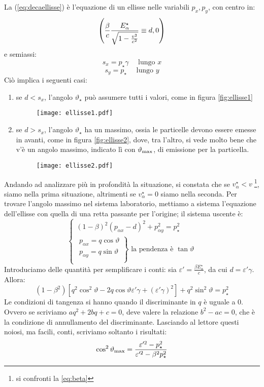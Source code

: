 La (\ref{eq:decaellisse}) \`e l'equazione di un ellisse nelle
variabili $p_x,p_y$, con centro in:
$$
\left(\frac{\beta}{c}\frac{E_{\alpha}^{\star}}{\sqrt{1-\frac{v^{2}}{c^{2}}}}\equiv
d,0\right)
$$
e semiassi:
$$
s_x=p_{\star}\gamma\quad\mbox{ lungo }x
$$
$$
s_y=p_{\star}\quad\mbox{ lungo }y
$$
Ci\`o implica i seguenti casi:
\begin{enumerate}
\item se $d<s_x$, l'angolo $\vartheta_{\star}$ pu\`o assumere
tutti i valori, come in f\mbox{}igura \vref{fig:ellisse1}

\begin{figure}[htbp]
\begin{center}
\texttt{[image: ellisse1.pdf]}
\caption{ } \label{fig:ellisse1}
\end{center}
\end{figure}

\item se $d>s_x$, l'angolo $\vartheta_{\star}$ ha un massimo,
ossia le particelle devono essere emesse in avanti, come in
f\mbox{}igura \vref{fig:ellisse2}, dove, tra l'altro, si vede
molto bene che v'\`e un angolo massimo, indicato l\`i con
$\vartheta_{\mathrm{max}}$, di emissione per la particella.

\begin{figure}[htbp]
\begin{center}
\texttt{[image: ellisse2.pdf]}
\caption{ } \label{fig:ellisse2}
\end{center}
\end{figure}
\end{enumerate}
Andando ad analizzare pi\`u in profondit\`a la situazione, si
constata che se $v_{\alpha}^{\star}<v\;$\footnote{si confronti la
\ref{eq:beta}}, siamo nella prima situazione, altrimenti se
$v_{\alpha}^{\star}=0$ siamo nella seconda. \newline Per trovare
l'angolo massimo nel sistema laboratorio, mettiamo a sistema
l'equazione dell'ellisse con quella di una retta passante per
l'origine; il sistema uscente \`e:
$$
\left\{\begin{array}{l} (1-\beta)^2(p_{\alpha x}-d)^2+p^2_{\alpha
y}=p_{\star}^2\\
\left.\begin{array}{l}
p_{\alpha x}=q\cos\vartheta\\
p_{\alpha y}=q\sin\vartheta\\
\end{array}\right\}\mbox{ la pendenza \`e }\tan\vartheta\end{array}\right.
$$
Introduciamo delle quantit\`a per semplif\mbox{}icare i conti: sia
$\varepsilon'=\frac{\beta E^{\star}_{\alpha}}{c}$, da cui
$d=\varepsilon'\gamma$. Allora:
$$
(1-\beta^2)[q^2\cos^2\vartheta-2q\cos\vartheta\varepsilon'\gamma +
(\varepsilon'\gamma)^2] + q^2\sin^2\vartheta
 = p^2_{\star}
$$
Le condizioni di tangenza si hanno quando il discriminante in $q$
\`e uguale a 0. Ovvero se scriviamo $aq^2+2bq+c=0$, deve valere la
relazione $b^2-ac=0$, che \`e la condizione di annullamento del
discriminante. Lasciando al lettore questi noiosi, ma facili,
conti, scriviamo soltanto i risultati:
$$
\cos^2\vartheta_{\mathrm{max}}=\frac{\varepsilon'^2-p_{\star}^2}{\varepsilon'^2-
\beta^2 
p_{\star}^2}
$$

